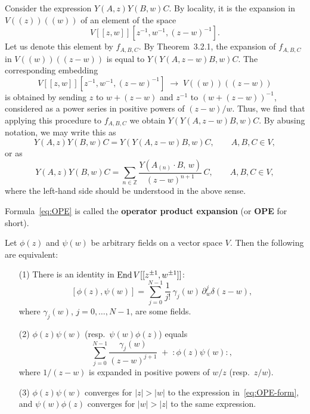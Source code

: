 \documentclass[12pt]{article}
\begin{document}
Consider the expression $Y(A,z)Y(B,w)C$.
By locality, it is the expansion in $V((z))((w))$ of an element of the space
\[
    V[[z,w]][z^{-1},w^{-1},(z-w)^{-1}].
\]
Let us denote this element by $f_{A,B,C}$.
By Theorem~3.2.1, the expansion of $f_{A,B,C}$ in $V((w))((z-w))$
is equal to $Y(Y(A,z-w)B,w)C$.
The corresponding embedding
\[
    V[[z,w]][z^{-1},w^{-1},(z-w)^{-1}] \;\to\; V((w))((z-w))
\]
is obtained by sending $z$ to $w+(z-w)$ and $z^{-1}$ to $(w+(z-w))^{-1}$,
considered as a power series in positive powers of $(z-w)/w$.
Thus, we find that applying this procedure to $f_{A,B,C}$
we obtain $Y(Y(A,z-w)B,w)C$.
By abusing notation, we may write this as
\[
    Y(A,z)Y(B,w)C = Y(Y(A,z-w)B,w)C, \qquad A,B,C\in V,
\]
or as
\begin{equation}
    \label{eq:OPE}
    Y(A,z)Y(B,w)C =
    \sum_{n\in\mathbb{Z}} \frac{Y(A_{(n)}\cdot B,\,w)}{(z-w)^{n+1}}\,C,
    \qquad A,B,C\in V,
\end{equation}
where the left-hand side should be understood in the above sense.
\begin{definition}
    Formula~\eqref{eq:OPE} is called the \textbf{operator product expansion} (or \textbf{OPE} for short).
\end{definition}

\begin{proposition}
    Let $\phi(z)$ and $\psi(w)$ be arbitrary fields on a vector space $V$.
    Then the following are equivalent:
    \begin{enumerate}
        \item[(1)] There is an identity in $\operatorname{End} V[[z^{\pm1},w^{\pm1}]]$:
              \begin{equation}\label{eq:delta-commutator}
                  [\phi(z),\psi(w)]
                  = \sum_{j=0}^{N-1} \frac{1}{j!}\,\gamma_j(w)\,\partial_w^{j}\delta(z-w),
              \end{equation}
              where $\gamma_j(w)$, $j=0,\dots,N-1$, are some fields.
        \item[(2)] $\phi(z)\psi(w)$ (resp.\ $\psi(w)\phi(z)$) equals
              \begin{equation}\label{eq:OPE-form}
                  \sum_{j=0}^{N-1} \frac{\gamma_j(w)}{(z-w)^{j+1}}
                  \;+\;
                  :\phi(z)\psi(w):,
              \end{equation}
              where $1/(z-w)$ is expanded in positive powers of $w/z$
              (resp.\ $z/w$).
        \item[(3)] $\phi(z)\psi(w)$ converges for $|z|>|w|$ to the expression
              in~\eqref{eq:OPE-form}, and $\psi(w)\phi(z)$ converges for $|w|>|z|$
              to the same expression.
    \end{enumerate}
\end{proposition}
\end{document}
